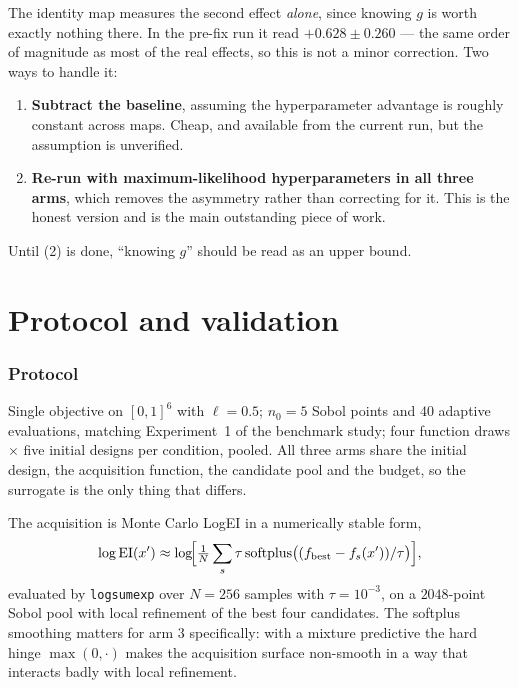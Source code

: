 \documentclass[11pt]{article}
\begin{document}
The identity map measures the second effect \emph{alone}, since knowing $g$ is
worth exactly nothing there. In the pre-fix run it read $+0.628\pm0.260$ --- the
same order of magnitude as most of the real effects, so this is not a minor
correction. Two ways to handle it:
\begin{enumerate}
\item \textbf{Subtract the baseline}, assuming the hyperparameter advantage is
roughly constant across maps. Cheap, and available from the current run, but the
assumption is unverified.
\item \textbf{Re-run with maximum-likelihood hyperparameters in all three
arms}, which removes the asymmetry rather than correcting for it. This is the
honest version and is the main outstanding piece of work.
\end{enumerate}
Until (2) is done, ``knowing $g$'' should be read as an upper bound.

\part{Protocol and validation}
\label{part:protocol}

\section{Protocol}

Single objective on $[0,1]^6$ with $\ell=0.5$; $n_0=5$ Sobol points and $40$
adaptive evaluations, matching Experiment~1 of the benchmark study; four
function draws $\times$ five initial designs per condition, pooled. All three
arms share the initial design, the acquisition function, the candidate pool and
the budget, so the surrogate is the only thing that differs.

The acquisition is Monte Carlo LogEI in a numerically stable form,
\begin{equation}
\log\mathrm{EI}(x')\approx\log\!\Bigl[\tfrac{1}{N}\sum_{s}\tau\,
\mathrm{softplus}\bigl((f_{\text{best}}-f_s(x'))/\tau\bigr)\Bigr],
\end{equation}
evaluated by \texttt{logsumexp} over $N=256$ samples with $\tau=10^{-3}$, on a
$2048$-point Sobol pool with local refinement of the best four candidates. The
softplus smoothing matters for arm 3 specifically: with a mixture predictive the
hard hinge $\max(0,\cdot)$ makes the acquisition surface non-smooth in a way that
interacts badly with local refinement.
\end{document}
